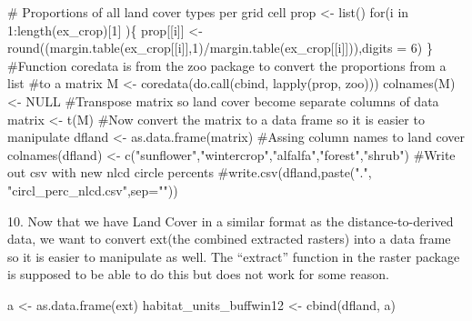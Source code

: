 \documentclass[
  letterpaper,
]{book}
\newenvironment{Shaded}{\begin{snugshade}}{\end{snugshade}}
\newcommand{\AttributeTok}[1]{\textcolor[rgb]{0.40,0.45,0.13}{#1}}
\newcommand{\CommentTok}[1]{\textcolor[rgb]{0.37,0.37,0.37}{#1}}
\newcommand{\ConstantTok}[1]{\textcolor[rgb]{0.56,0.35,0.01}{#1}}
\newcommand{\ControlFlowTok}[1]{\textcolor[rgb]{0.00,0.23,0.31}{#1}}
\newcommand{\DecValTok}[1]{\textcolor[rgb]{0.68,0.00,0.00}{#1}}
\newcommand{\FunctionTok}[1]{\textcolor[rgb]{0.28,0.35,0.67}{#1}}
\newcommand{\NormalTok}[1]{\textcolor[rgb]{0.00,0.23,0.31}{#1}}
\newcommand{\OtherTok}[1]{\textcolor[rgb]{0.00,0.23,0.31}{#1}}
\newcommand{\SpecialCharTok}[1]{\textcolor[rgb]{0.37,0.37,0.37}{#1}}
\newcommand{\StringTok}[1]{\textcolor[rgb]{0.13,0.47,0.30}{#1}}
\begin{document}
\begin{Shaded}
\begin{Highlighting}[]
\CommentTok{\# Proportions of all land cover types per grid cell}
\NormalTok{prop }\OtherTok{\textless{}{-}} \FunctionTok{list}\NormalTok{()}
\ControlFlowTok{for}\NormalTok{(i }\ControlFlowTok{in} \DecValTok{1}\SpecialCharTok{:}\FunctionTok{length}\NormalTok{(ex\_crop)[}\DecValTok{1}\NormalTok{] )\{}
\NormalTok{  prop[[i]] }\OtherTok{\textless{}{-}} \FunctionTok{round}\NormalTok{((}\FunctionTok{margin.table}\NormalTok{(ex\_crop[[i]],}\DecValTok{1}\NormalTok{)}\SpecialCharTok{/}\FunctionTok{margin.table}\NormalTok{(ex\_crop[[i]])),}\AttributeTok{digits =} \DecValTok{6}\NormalTok{)}
\NormalTok{\}}
\CommentTok{\#Function coredata is from the zoo package to convert the proportions from a list }
\CommentTok{\#to a matrix}
\NormalTok{M }\OtherTok{\textless{}{-}} \FunctionTok{coredata}\NormalTok{(}\FunctionTok{do.call}\NormalTok{(cbind, }\FunctionTok{lapply}\NormalTok{(prop, zoo)))}
\FunctionTok{colnames}\NormalTok{(M) }\OtherTok{\textless{}{-}} \ConstantTok{NULL}
\CommentTok{\#Transpose matrix so land cover become separate columns of data}
\NormalTok{matrix }\OtherTok{\textless{}{-}} \FunctionTok{t}\NormalTok{(M)}
\CommentTok{\#Now convert the matrix to a data frame so it is easier to manipulate}
\NormalTok{dfland }\OtherTok{\textless{}{-}} \FunctionTok{as.data.frame}\NormalTok{(matrix)}
\CommentTok{\#Assing column names to land cover}
\FunctionTok{colnames}\NormalTok{(dfland) }\OtherTok{\textless{}{-}} \FunctionTok{c}\NormalTok{(}\StringTok{"sunflower"}\NormalTok{,}\StringTok{"wintercrop"}\NormalTok{,}\StringTok{"alfalfa"}\NormalTok{,}\StringTok{"forest"}\NormalTok{,}\StringTok{"shrub"}\NormalTok{)}
\CommentTok{\#Write out csv with new nlcd circle percents}
\CommentTok{\#write.csv(dfland,paste(".", "circl\_perc\_nlcd.csv",sep=""))}
\end{Highlighting}
\end{Shaded}

10. Now that we have Land Cover in a similar format as the
distance-to-derived data, we want to convert ext(the combined extracted
rasters) into a data frame so it is easier to manipulate as well. The
``extract'' function in the raster package is supposed to be able to do
this but does not work for some reason.

\begin{Shaded}
\begin{Highlighting}[]
\NormalTok{a }\OtherTok{\textless{}{-}} \FunctionTok{as.data.frame}\NormalTok{(ext)}
\NormalTok{habitat\_units\_buffwin12 }\OtherTok{\textless{}{-}} \FunctionTok{cbind}\NormalTok{(dfland, a)}
\end{Highlighting}
\end{Shaded}
\end{document}
